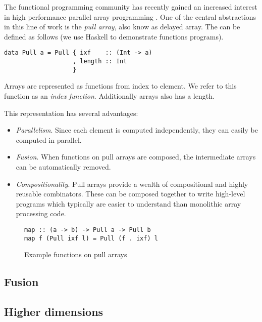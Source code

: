 \documentclass{sigplanconf}
\begin{document}
The functional programming community has recently gained an increased
interest in high performance parallel array programming
\cite{keller2010regular,Axelsson:2010:Feldspar,Mainland:2010:Nikola,Svensson:2011:Obsidian,Claessen:2012:Expressive,Ankner:2013:AnEDSL,lippmeier2011efficient}. One
of the central abstractions in this line of work is the \emph{pull
  array}, also know as delayed array. The can be defined as follows
(we use Haskell \cite{marlow2010haskell} to demonstrate functions
programs).

\begin{verbatim}
data Pull a = Pull { ixf    :: (Int -> a)
                   , length :: Int
                   }
\end{verbatim}

Arrays are represented as functions from index to element. We refer to
this function as an \emph{index function}. Additionally arrays also
has a length.

This representation has several advantages:
\begin{itemize}
\item \emph{Parallelism}. Since each element is computed
  independently, they can easily be computed in parallel.
\item \emph{Fusion}. When functions on pull arrays are composed, the intermediate
  arrays can be automatically removed. 
\item \emph{Compositionality}. Pull arrays provide a wealth of
  compositional and highly reusable combinators. These can be composed
  together to write high-level programs which typically are easier to
  understand than monolithic array processing code.
\end{itemize}

\begin{figure}
\begin{verbatim}
map :: (a -> b) -> Pull a -> Pull b
map f (Pull ixf l) = Pull (f . ixf) l
\end{verbatim}
\caption{Example functions on pull arrays}
\end{figure}

\subsection{Fusion}

\subsection{Higher dimensions}
\end{document}
